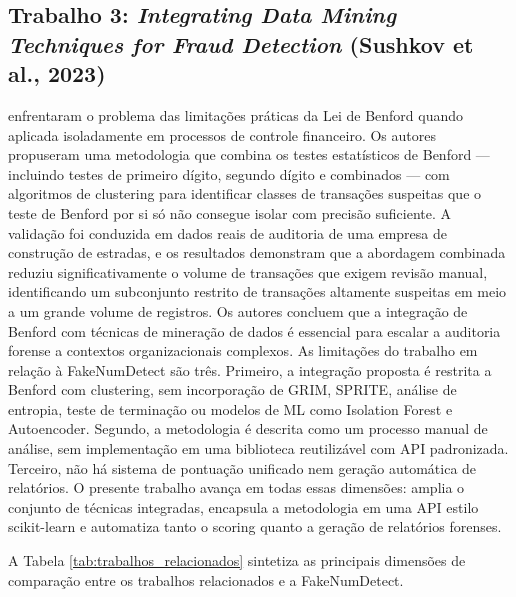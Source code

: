 \documentclass[
    12pt,                %
    openright,           %
    oneside,             %
    a4paper,             %
    english,             %
    brazil               %
]{abntex2}
\begin{document}
\subsection{Trabalho 3: \textit{Integrating Data Mining Techniques for Fraud Detection} (Sushkov et al., 2023)}
 enfrentaram o problema das limitações práticas da Lei de Benford quando aplicada isoladamente em processos de controle financeiro. Os autores propuseram uma metodologia que combina os testes estatísticos de Benford — incluindo testes de primeiro dígito, segundo dígito e combinados — com algoritmos de clustering para identificar classes de transações suspeitas que o teste de Benford por si só não consegue isolar com precisão suficiente.
A validação foi conduzida em dados reais de auditoria de uma empresa de construção de estradas, e os resultados demonstram que a abordagem combinada reduziu significativamente o volume de transações que exigem revisão manual, identificando um subconjunto restrito de transações altamente suspeitas em meio a um grande volume de registros. Os autores concluem que a integração de Benford com técnicas de mineração de dados é essencial para escalar a auditoria forense a contextos organizacionais complexos.
As limitações do trabalho em relação à FakeNumDetect são três. Primeiro, a integração proposta é restrita a Benford com clustering, sem incorporação de GRIM, SPRITE, análise de entropia, teste de terminação ou modelos de ML como Isolation Forest e Autoencoder. Segundo, a metodologia é descrita como um processo manual de análise, sem implementação em uma biblioteca reutilizável com API padronizada. Terceiro, não há sistema de pontuação unificado nem geração automática de relatórios. O presente trabalho avança em todas essas dimensões: amplia o conjunto de técnicas integradas, encapsula a metodologia em uma API estilo scikit-learn e automatiza tanto o scoring quanto a geração de relatórios forenses.

\vspace{0.5cm}

A Tabela \ref{tab:trabalhos_relacionados} sintetiza as principais dimensões de comparação entre os trabalhos relacionados e a FakeNumDetect.
\end{document}
